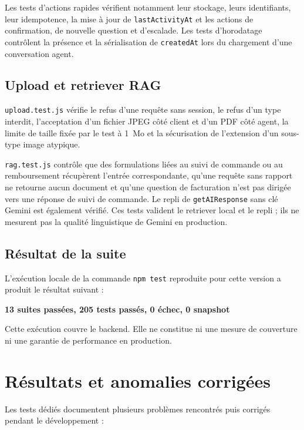 Les tests d'actions rapides vérifient notamment leur stockage, leurs identifiants, leur idempotence, la mise à jour de \texttt{lastActivityAt} et les actions de confirmation, de nouvelle question et d'escalade. Les tests d'horodatage contrôlent la présence et la sérialisation de \texttt{createdAt} lors du chargement d'une conversation agent.

\subsection{Upload et retriever RAG}

\texttt{upload.test.js} vérifie le refus d'une requête sans session, le refus d'un type interdit, l'acceptation d'un fichier JPEG côté client et d'un PDF côté agent, la limite de taille fixée par le test à 1~Mo et la sécurisation de l'extension d'un sous-type image atypique.

\texttt{rag.test.js} contrôle que des formulations liées au suivi de commande ou au remboursement récupèrent l'entrée correspondante, qu'une requête sans rapport ne retourne aucun document et qu'une question de facturation n'est pas dirigée vers une réponse de suivi de commande. Le repli de \texttt{getAIResponse} sans clé Gemini est également vérifié. Ces tests valident le retriever local et le repli ; ils ne mesurent pas la qualité linguistique de Gemini en production.

\subsection{Résultat de la suite}

L'exécution locale de la commande \texttt{npm test} reproduite pour cette version a produit le résultat suivant :

\begin{center}
\textbf{13 suites passées, 205 tests passés, 0 échec, 0 snapshot}
\end{center}

Cette exécution couvre le backend. Elle ne constitue ni une mesure de couverture ni une garantie de performance en production.

\section{Résultats et anomalies corrigées}

Les tests dédiés documentent plusieurs problèmes rencontrés puis corrigés pendant le développement :


